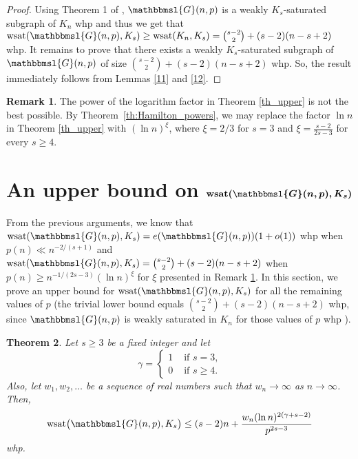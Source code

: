 \documentclass[hidelinks, 11pt]{article}
\theoremstyle{plain}
\newtheorem{theorem}{Theorem}[section]
\theoremstyle{definition}
\newtheorem{remark}[theorem]{Remark}
\newcommand{\bmi}[1]{\mbox{\boldmath $ #1$}}
\begin{document}
\begin{proof}
Using    Theorem 1 of  \cite{bal},    $\mathbbmsl{G}(n,p)$ is a weakly $K_s$-saturated subgraph of  $K_n$ whp and thus    we get  that $\mathrm{wsat}(\mathbbmsl{G}(n, p), K_s)\geq\mathrm{wsat}(K_n, K_s)={s-2 \choose 2}+(s-2)(n-s+2)$  whp.
It remains to prove that  there exists a weakly $K_s$-saturated subgraph of $\mathbbmsl{G}(n,p)$ of size   ${s-2\choose 2}+(s-2)(n-s+2)$    whp. So,
the result immediately  follows  from Lemmas \ref{11} and \ref{12}.
\end{proof}




\begin{remark}\label{rmrk}
The power of  the logarithm  factor in Theorem \ref{th_upper} is not the best possible.  By Theorem~\ref{th:Hamilton_powers}, we may replace the factor $\ln n$ in Theorem \ref{th_upper} with $(\ln n)^{\xi}$, where $\xi=2/3$ for $s=3$ and $\xi=\frac{s-2}{2s-3}$ for every $s\geq 4$.
\end{remark}



\section{An  upper bound on $\bmi{\mathrm{wsat}(\mathbbmsl{G}(n, p), K_s)}$}\label{secUpperwsat}



From the previous arguments, we know that  $\mathrm{wsat}(\mathbbmsl{G}(n, p), K_s)=e(\mathbbmsl{G}(n,p))(1+o(1))$ whp when $p(n)\ll n^{-2/(s+1)}$ and $\mathrm{wsat}(\mathbbmsl{G}(n, p), K_s)={s-2\choose 2}+(s-2)(n-s+2)$  when $p(n)\geq n^{-1/(2s-3)}(\ln n)^{\xi}$ for    $\xi$  presented  in Remark \ref{rmrk}. In this section, we prove an upper bound for $\mathrm{wsat}(\mathbbmsl{G}(n, p), K_s)$ for all the remaining values of $p$ (the trivial lower bound equals ${s-2\choose 2}+(s-2)(n-s+2)$ whp,  since $\mathbbmsl{G}(n,p)$ is weakly saturated in $K_n$ for those values of $p$ whp \cite{bal}).


\begin{theorem}\label{upperbd}
Let  $s\geq 3$ be  a fixed  integer and let
$$\gamma=\left\{\begin{array}{ll}
1  &   \mbox{ if } s=3\mbox{,}\\
0 &  \mbox{ if } s\geq 4\mbox{.}
\end{array}\right.$$
Also, let  $w_1, w_2, \ldots$ be a sequence of real numbers such that   $w_n\to\infty$ as $n\to\infty$. Then,      $$\mathrm{wsat}\big(\mathbbmsl{G}(n, p), K_s\big)\leq (s-2)n+\frac{w_n(\ln n)^{2(\gamma+s-2)}}{p^{2s-3}}$$ whp.
\end{theorem}
\end{document}
